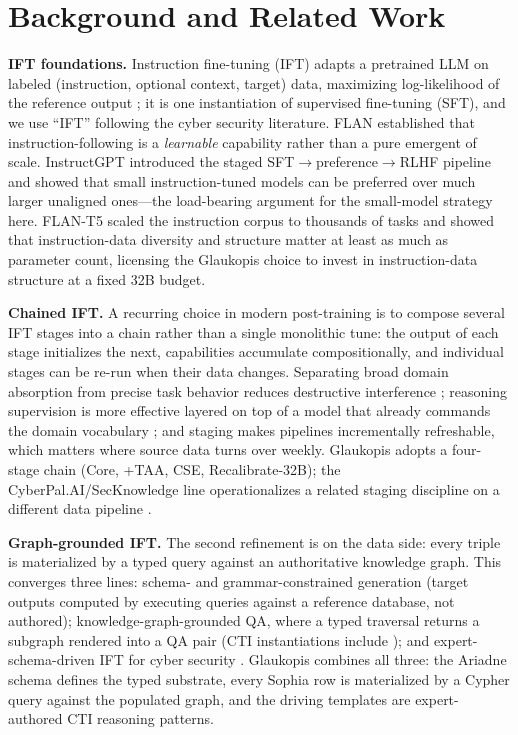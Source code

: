 \documentclass[conference]{IEEEtran}
\begin{document}
\section{Background and Related Work}
\label{sec:ift-slm}

\textbf{IFT foundations.} Instruction fine-tuning (IFT) adapts a pretrained LLM on labeled (instruction, optional context, target) data, maximizing log-likelihood of the reference output \cite{wei2022flan,ouyang2022instructgpt}; it is one instantiation of supervised fine-tuning (SFT), and we use ``IFT'' following the cyber security literature. FLAN \cite{wei2022flan} established that instruction-following is a \emph{learnable} capability rather than a pure emergent of scale. InstructGPT \cite{ouyang2022instructgpt} introduced the staged SFT$\to$preference$\to$RLHF pipeline and showed that small instruction-tuned models can be preferred over much larger unaligned ones---the load-bearing argument for the small-model strategy here. FLAN-T5 \cite{chung2022flant5} scaled the instruction corpus to thousands of tasks and showed that instruction-data diversity and structure matter at least as much as parameter count, licensing the Glaukopis choice to invest in instruction-data structure at a fixed 32B budget.

\textbf{Chained IFT.} A recurring choice in modern post-training is to compose several IFT stages into a chain rather than a single monolithic tune: the output of each stage initializes the next, capabilities accumulate compositionally, and individual stages can be re-run when their data changes. Separating broad domain absorption from precise task behavior reduces destructive interference \cite{gururangan2020dontstop,ouyang2022instructgpt}; reasoning supervision is more effective layered on top of a model that already commands the domain vocabulary \cite{wei2022cot,levi2025toward}; and staging makes pipelines incrementally refreshable, which matters where source data turns over weekly. Glaukopis adopts a four-stage chain (Core, +TAA, CSE, Recalibrate-32B); the CyberPal.AI/SecKnowledge line operationalizes a related staging discipline on a different data pipeline \cite{levi2024cyberpal,levi2025toward}.

\textbf{Graph-grounded IFT.} The second refinement is on the data side: every triple is materialized by a typed query against an authoritative knowledge graph. This converges three lines: schema- and grammar-constrained generation (target outputs computed by executing queries against a reference database, not authored); knowledge-graph-grounded QA, where a typed traversal returns a subgraph rendered into a QA pair (CTI instantiations include \cite{fieblinger2024kg,wu2022opencykg,yu2024ctikg,zhao2024kctiaa,zhang2023cyberkg}); and expert-schema-driven IFT for cyber security \cite{levi2024cyberpal,levi2025toward}. Glaukopis combines all three: the Ariadne schema defines the typed substrate, every Sophia row is materialized by a Cypher query against the populated graph, and the driving templates are expert-authored CTI reasoning patterns.
\end{document}
